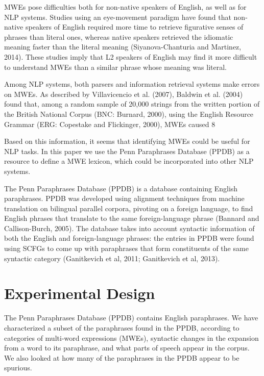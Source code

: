 \documentclass[11pt]{article}
\begin{document}
MWEs pose difficulties both for non-native speakers of English, as well as for NLP systems. Studies using an eye-movement paradigm have found that non-native speakers of English required more time to retrieve figurative senses of phrases than literal ones, whereas native speakers retrieved the idiomatic meaning faster than the literal meaning (Siyanova-Chanturia and Martinez, 2014). These studies imply that L2 speakers of English may find it more difficult to understand MWEs than a similar phrase whose meaning was literal.

Among NLP systems, both parsers and information retrieval systems make errors on MWEs. As described by Villavicencio et al. (2007), Baldwin et al. (2004) found that, among a random sample of 20,000 strings from the written portion of the British National Corpus (BNC: Burnard, 2000), using the English Resource Grammar (ERG: Copestake and Flickinger, 2000), MWEs caused 8%

Based on this information, it seems that identifying MWEs could be useful for NLP tasks. In this paper we use the Penn Paraphrases Database (PPDB) as a resource to define a MWE lexicon, which could be incorporated into other NLP systems.

The Penn Paraphrases Database (PPDB) is a database containing English paraphrases. PPDB was developed using alignment techniques from machine translation on bilingual parallel corpora, pivoting on a foreign language, to find English phrases that translate to the same foreign-language phrase (Bannard and Callison-Burch, 2005). The database takes into account syntactic information of both the English and foreign-language phrases: the entries in PPDB were found using SCFGs to come up with paraphrases that form constituents of the same syntactic category (Ganitkevich et al, 2011; Ganitkevich et al, 2013).

\section{Experimental Design}
The Penn Paraphrases Database (PPDB) contains English paraphrases. We have characterized a subset of the paraphrases found in the PPDB, according to categories of multi-word expressions (MWEs), syntactic changes in the expansion from a word to its paraphrase, and what parts of speech appear in the corpus. We also looked at how many of the paraphrases in the PPDB appear to be spurious.
\end{document}
